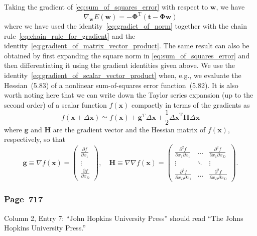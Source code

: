 \documentclass[12pt,a4paper]{article}
\newcommand{\erratum}[1]{\subsubsection*{#1}}
\begin{document}
Taking the gradient of \eqref{eq:sum_of_squares_error} with respect to $\mathbf{w}$, we have
\begin{equation}
\nabla_{\mathbf{w}} E(\mathbf{w}) =
-\bm{\Phi}^{\operatorname{T}} \left( \mathbf{t} - \bm{\Phi}\mathbf{w} \right)
\end{equation}
where we have used the identity~\eqref{eq:gradiet_of_norm} together with
the chain rule~\eqref{eq:chain_rule_for_gradient} and
the identity~\eqref{eq:gradient_of_matrix_vector_product}.
The same result can also be obtained by first expanding the square norm in
\eqref{eq:sum_of_squares_error} and then differentiating it using the gradient identities
given above.
We use the identity~\eqref{eq:gradient_of_scalar_vector_product}
when, e.g., we evaluate the Hessian~(5.83) of a nonlinear sum-of-squares error function~(5.82).
It is also worth noting here that we can write down the Taylor series expansion
(up to the second order) of a scalar function $f(\mathbf{x})$ compactly
in terms of the gradients as
\begin{equation}
f(\mathbf{x} + \Delta\mathbf{x}) \simeq
f(\mathbf{x})
+ \mathbf{g}^{\operatorname{T}} \Delta\mathbf{x}
+ \frac{1}{2} {\Delta\mathbf{x}}^{\operatorname{T}} \mathbf{H} \Delta\mathbf{x}
\end{equation}
where $\mathbf{g}$ and $\mathbf{H}$ are the gradient vector and the Hessian matrix of
$f(\mathbf{x})$, respectively, so that
\begin{equation}
\mathbf{g} \equiv \nabla f(\mathbf{x}) =
\begin{pmatrix}
\frac{\partial f}{\partial x_{1}} \\
\vdots \\
\frac{\partial f}{\partial x_{D}}
\end{pmatrix} , \quad
\mathbf{H} \equiv \nabla\nabla f(\mathbf{x}) =
\begin{pmatrix}
\frac{\partial^{2} f}{\partial x_{1} \partial x_{1}} &
\hdots &
\frac{\partial^{2} f}{\partial x_{1} \partial x_{D}} \\
\vdots & \ddots & \vdots \\
\frac{\partial^{2} f}{\partial x_{D} \partial x_{1}} &
\hdots &
\frac{\partial^{2} f}{\partial x_{D} \partial x_{D}}
\end{pmatrix} .
\end{equation}


\erratum{Page~717}
Column 2, Entry 7:
``John Hopkins University Press'' should read ``The Johns Hopkins University Press.''



\end{document}
